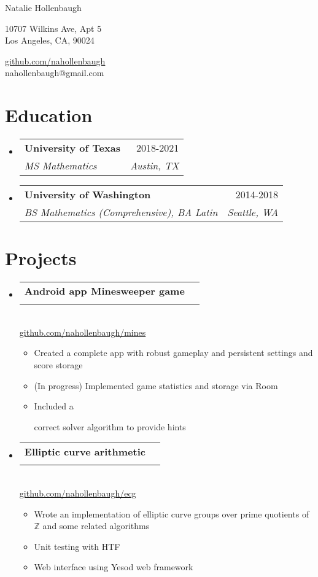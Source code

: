 \documentclass[letterpaper,11pt]{article}
\makeatletter
\newcommand{\resumeItem}[1]{
  \item{
    {#1 \vspace{-4pt}}
  }
}
\newcommand{\resumeSubheading}[4]{
  \vspace{-2pt}\item
    \begin{tabular*}{0.97\textwidth}[t]{l@{\extracolsep{\fill}}r}
      \textbf{#1} & #2 \\
      \textit{\small #3} & \textit{\small #4} \\
    \end{tabular*}\vspace{-10pt}
}
\newcommand{\resumeSubHeadingListStart}{\begin{itemize}[leftmargin=0.15in, label={}]}
\newcommand{\resumeSubHeadingListEnd}{\end{itemize}}
\newcommand{\resumeItemListStart}{\begin{itemize}}
\newcommand{\resumeItemListEnd}{\end{itemize}\vspace{-2pt}}
\newcommand\commenttt[1]{}
\makeatother
\begin{document}
\begin{center}
    {\LARGE Natalie Hollenbaugh} \\ \vspace{0pt}
    \begin{multicols}{2}
    \begin{flushleft}
    \large{10707 Wilkins Ave, Apt 5} \\
    \large{Los Angeles, CA, 90024} \\
    \end{flushleft}
    
    \begin{flushright}
    \href{https://github.com/nahollenbaugh}{\large{github.com/nahollenbaugh}}\\
    \href{mailto:{nahollenbaugh@gmail.com}} \large{nahollenbaugh@gmail.com}
    \end{flushright}
    \end{multicols}
\end{center}


\section{Education}
\resumeSubHeadingListStart

    \resumeSubheading
        {University of Texas}{2018-2021}
        {MS Mathematics}
        {Austin, TX}
    \resumeSubheading
        {University of Washington}{2014-2018}
        {BS Mathematics (Comprehensive), BA Latin}
        {Seattle, WA}

\resumeSubHeadingListEnd

\section{Projects}
\resumeSubHeadingListStart
\resumeSubheading{Android app Minesweeper game}{}{}{}\\\vspace{-1ex}
  \hspace{2em}\href{https://github.com/nahollenbaugh/mines}{github.com/nahollenbaugh/mines}\vspace{-1ex}
  \resumeItemListStart\small
    \resumeItem{Created a complete app with robust gameplay and persistent settings and 
      score storage}
    \resumeItem{(In progress) Implemented game statistics and storage via Room}
    \resumeItem{Included a%
      \commenttt{efficient and (rmk. make meaningful)}
      correct solver algorithm to provide hints}
  \resumeItemListEnd
\resumeSubheading{Elliptic curve arithmetic}{}{}{}\\\vspace{-1ex}
  \hspace{2em}\href{https://github.com/nahollenbaugh/ecg}{github.com/nahollenbaugh/ecg}\vspace{-1ex}
  \resumeItemListStart\small
    \resumeItem{Wrote an implementation of elliptic curve groups over prime quotients of 
      $\mathbb Z$ and some related algorithms}
    \resumeItem{Unit testing with HTF}
    \resumeItem{Web interface using Yesod web framework}
  \resumeItemListEnd
\resumeSubHeadingListEnd
\end{document}
